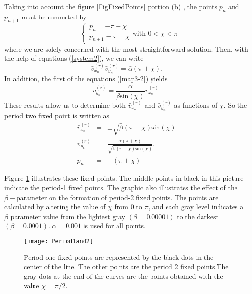 \documentclass[reprint, aps, pre,nofootinbib]{revtex4-1}
\begin{document}
Taking into account the figure \ref{FigFixedPoints} portion (b) ,
the points $p_{n}$ and $p_{n+1}$ must be connected by
\[
\textrm{ }\begin{cases}
p_{n}=-\pi-\chi\\
p_{n+1}=\pi+\chi
\end{cases}\textrm{with }0<\chi<\pi
\]
where we are solely concerned with the most straightforward solution.
Then, with the help of equations (\ref{system2}), we can write 
\begin{equation}
\bar{v}_{x_{n}}^{(r)}\bar{v}_{y_{n}}^{(r)}=\bar{\alpha}\left(\pi+\chi\right).\label{peri2A}
\end{equation}
In addition, the first of the equations (\ref{map3-2}) yields
\begin{equation}
\bar{v}_{y_{n}}^{(r)}=\frac{\bar{\alpha}}{\bar{\beta}\textrm{sin}\left(\chi\right)}\bar{v}_{x_{n}}^{(r)}.\label{peri2B}
\end{equation}
These results allow us to determine both $\bar{v}_{x_{n}}^{(r)}$
and $\bar{v}_{y_{n}}^{(r)}$ as functions of $\chi$. So the period
two fixed point is written as
\begin{eqnarray*}
\bar{v}_{x_{n}}^{(r)} & = & \pm\sqrt{\bar{\beta}\left(\pi+\chi\right)\textrm{sin}\left(\chi\right)}\\
\bar{v}_{y_{n}}^{(r)} & = & \frac{\bar{\alpha}\left(\pi+\chi\right)}{\sqrt{\bar{\beta}\left(\pi+\chi\right)\textrm{sin}\left(\chi\right)}},\\
p_{n} & = & \mp\left(\pi+\chi\right)
\end{eqnarray*}

Figure \ref{FigPeriod1and2} illustrates these fixed points. The middle
points in black in this picture indicate the period-1 fixed points.
The graphic also illustrates the effect of the $\beta-$parameter
on the formation of period-2 fixed points. The points are calculated
by altering the value of $\chi$ from 0 to $\pi$, and each gray level
indicates a $\beta$ parameter value from the lightest gray $(\beta=0.00001)$
to the darkest $(\beta=0.0001)$. $\alpha=0.001$ is used for all
points. 
\begin{figure}[H]
\centering{}\texttt{[image: Period1and2]}\caption{Period one fixed points are represented by the black dots in the center
of the line. The other points are the period 2 fixed points.The gray
dots at the end of the curves are the points obtained with the value
$\chi=\pi/2.$}
\label{FigPeriod1and2}
\end{figure}
\end{document}
